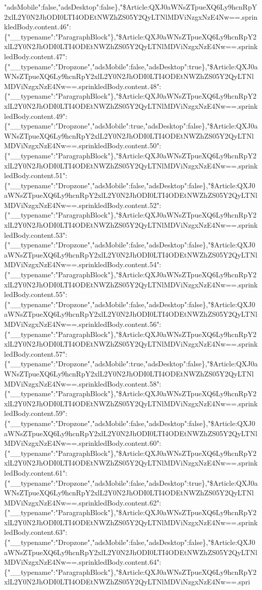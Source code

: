 "adsMobile":false,"adsDesktop":false\},"\$Article:QXJ0aWNsZTpueXQ6Ly9hcnRpY2xlL2Y0N2JhODI0LTI4ODEtNWZhZS05Y2QyLTNlMDViNzgxNzE4Nw==.sprinkledBody.content.46":\{"\_\_typename":"ParagraphBlock"\},"\$Article:QXJ0aWNsZTpueXQ6Ly9hcnRpY2xlL2Y0N2JhODI0LTI4ODEtNWZhZS05Y2QyLTNlMDViNzgxNzE4Nw==.sprinkledBody.content.47":\{"\_\_typename":"Dropzone","adsMobile":false,"adsDesktop":true\},"\$Article:QXJ0aWNsZTpueXQ6Ly9hcnRpY2xlL2Y0N2JhODI0LTI4ODEtNWZhZS05Y2QyLTNlMDViNzgxNzE4Nw==.sprinkledBody.content.48":\{"\_\_typename":"ParagraphBlock"\},"\$Article:QXJ0aWNsZTpueXQ6Ly9hcnRpY2xlL2Y0N2JhODI0LTI4ODEtNWZhZS05Y2QyLTNlMDViNzgxNzE4Nw==.sprinkledBody.content.49":\{"\_\_typename":"Dropzone","adsMobile":true,"adsDesktop":false\},"\$Article:QXJ0aWNsZTpueXQ6Ly9hcnRpY2xlL2Y0N2JhODI0LTI4ODEtNWZhZS05Y2QyLTNlMDViNzgxNzE4Nw==.sprinkledBody.content.50":\{"\_\_typename":"ParagraphBlock"\},"\$Article:QXJ0aWNsZTpueXQ6Ly9hcnRpY2xlL2Y0N2JhODI0LTI4ODEtNWZhZS05Y2QyLTNlMDViNzgxNzE4Nw==.sprinkledBody.content.51":\{"\_\_typename":"Dropzone","adsMobile":false,"adsDesktop":false\},"\$Article:QXJ0aWNsZTpueXQ6Ly9hcnRpY2xlL2Y0N2JhODI0LTI4ODEtNWZhZS05Y2QyLTNlMDViNzgxNzE4Nw==.sprinkledBody.content.52":\{"\_\_typename":"ParagraphBlock"\},"\$Article:QXJ0aWNsZTpueXQ6Ly9hcnRpY2xlL2Y0N2JhODI0LTI4ODEtNWZhZS05Y2QyLTNlMDViNzgxNzE4Nw==.sprinkledBody.content.53":\{"\_\_typename":"Dropzone","adsMobile":false,"adsDesktop":false\},"\$Article:QXJ0aWNsZTpueXQ6Ly9hcnRpY2xlL2Y0N2JhODI0LTI4ODEtNWZhZS05Y2QyLTNlMDViNzgxNzE4Nw==.sprinkledBody.content.54":\{"\_\_typename":"ParagraphBlock"\},"\$Article:QXJ0aWNsZTpueXQ6Ly9hcnRpY2xlL2Y0N2JhODI0LTI4ODEtNWZhZS05Y2QyLTNlMDViNzgxNzE4Nw==.sprinkledBody.content.55":\{"\_\_typename":"Dropzone","adsMobile":false,"adsDesktop":false\},"\$Article:QXJ0aWNsZTpueXQ6Ly9hcnRpY2xlL2Y0N2JhODI0LTI4ODEtNWZhZS05Y2QyLTNlMDViNzgxNzE4Nw==.sprinkledBody.content.56":\{"\_\_typename":"ParagraphBlock"\},"\$Article:QXJ0aWNsZTpueXQ6Ly9hcnRpY2xlL2Y0N2JhODI0LTI4ODEtNWZhZS05Y2QyLTNlMDViNzgxNzE4Nw==.sprinkledBody.content.57":\{"\_\_typename":"Dropzone","adsMobile":true,"adsDesktop":false\},"\$Article:QXJ0aWNsZTpueXQ6Ly9hcnRpY2xlL2Y0N2JhODI0LTI4ODEtNWZhZS05Y2QyLTNlMDViNzgxNzE4Nw==.sprinkledBody.content.58":\{"\_\_typename":"ParagraphBlock"\},"\$Article:QXJ0aWNsZTpueXQ6Ly9hcnRpY2xlL2Y0N2JhODI0LTI4ODEtNWZhZS05Y2QyLTNlMDViNzgxNzE4Nw==.sprinkledBody.content.59":\{"\_\_typename":"Dropzone","adsMobile":false,"adsDesktop":false\},"\$Article:QXJ0aWNsZTpueXQ6Ly9hcnRpY2xlL2Y0N2JhODI0LTI4ODEtNWZhZS05Y2QyLTNlMDViNzgxNzE4Nw==.sprinkledBody.content.60":\{"\_\_typename":"ParagraphBlock"\},"\$Article:QXJ0aWNsZTpueXQ6Ly9hcnRpY2xlL2Y0N2JhODI0LTI4ODEtNWZhZS05Y2QyLTNlMDViNzgxNzE4Nw==.sprinkledBody.content.61":\{"\_\_typename":"Dropzone","adsMobile":false,"adsDesktop":true\},"\$Article:QXJ0aWNsZTpueXQ6Ly9hcnRpY2xlL2Y0N2JhODI0LTI4ODEtNWZhZS05Y2QyLTNlMDViNzgxNzE4Nw==.sprinkledBody.content.62":\{"\_\_typename":"ParagraphBlock"\},"\$Article:QXJ0aWNsZTpueXQ6Ly9hcnRpY2xlL2Y0N2JhODI0LTI4ODEtNWZhZS05Y2QyLTNlMDViNzgxNzE4Nw==.sprinkledBody.content.63":\{"\_\_typename":"Dropzone","adsMobile":false,"adsDesktop":false\},"\$Article:QXJ0aWNsZTpueXQ6Ly9hcnRpY2xlL2Y0N2JhODI0LTI4ODEtNWZhZS05Y2QyLTNlMDViNzgxNzE4Nw==.sprinkledBody.content.64":\{"\_\_typename":"ParagraphBlock"\},"\$Article:QXJ0aWNsZTpueXQ6Ly9hcnRpY2xlL2Y0N2JhODI0LTI4ODEtNWZhZS05Y2QyLTNlMDViNzgxNzE4Nw==.spri